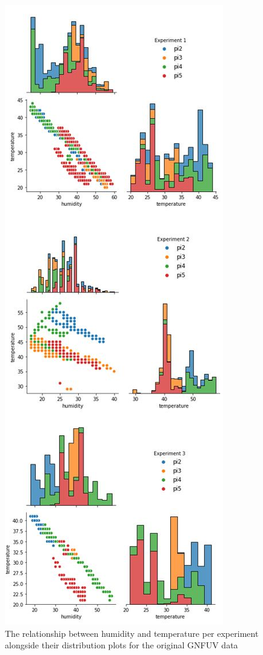 \documentclass{mpaper}
\begin{document}
\begin{figure}
\centering
\begin{center}
\includegraphics[scale=0.65]{gnfuv_pairplots.JPG}
\end{center}
\caption{\label{fig:gnfuv_pairplots} The relationship between humidity and temperature per experiment alongside their distribution plots for the original GNFUV data}
\end{figure}
\end{document}
